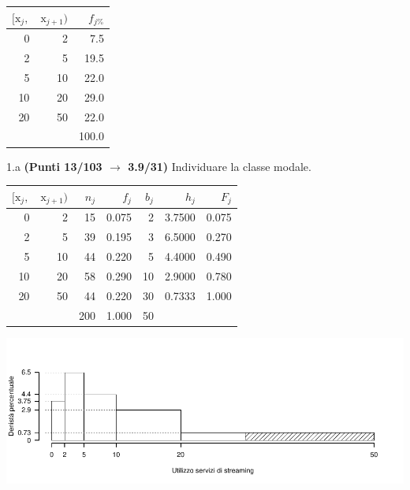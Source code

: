\documentclass[
  11pt,
]{book}
\theoremstyle{mytheoremstyle}
\theoremstyle{mydefstyle}
\newenvironment{sol}
  {
  \begin{tcolorbox}[enhanced,breakable,arc=0.1mm,boxrule=1pt,colback=white,colframe=iblue,
  title=\bf \fontfamily{lmss}\selectfont \hspace{.5 cm} Soluzione,drop fuzzy shadow]

}{
\end{tcolorbox}
  }
\begin{document}
\begin{table}[H]
\centering
\begin{tabular}{rrr}
\toprule
$[\text{x}_j,$ & $\text{x}_{j+1})$ & $f_{j\%}$\\
\midrule
0 & 2 & 7.5\\
2 & 5 & 19.5\\
5 & 10 & 22.0\\
10 & 20 & 29.0\\
20 & 50 & 22.0\\
 &  & 100.0\\
\bottomrule
\end{tabular}
\end{table}

1.a \textbf{(Punti 13/103 \(\rightarrow\) 3.9/31)} Individuare la classe modale.

\begin{sol}

\begin{table}[H]
\centering
\begin{tabular}{rrrrrrr}
\toprule
$[\text{x}_j,$ & $\text{x}_{j+1})$ & $n_j$ & $f_j$ & $b_j$ & $h_j$ & $F_j$\\
\midrule
0 & 2 & 15 & 0.075 & 2 & 3.7500 & 0.075\\
2 & 5 & 39 & 0.195 & 3 & 6.5000 & 0.270\\
5 & 10 & 44 & 0.220 & 5 & 4.4000 & 0.490\\
10 & 20 & 58 & 0.290 & 10 & 2.9000 & 0.780\\
20 & 50 & 44 & 0.220 & 30 & 0.7333 & 1.000\\
 &  & 200 & 1.000 & 50 &  & \\
\bottomrule
\end{tabular}
\end{table}

\begin{center}\includegraphics{Esami_passati_con_soluzioni_files/figure-latex/2023-212-1} \end{center}

\end{sol}
\end{document}
